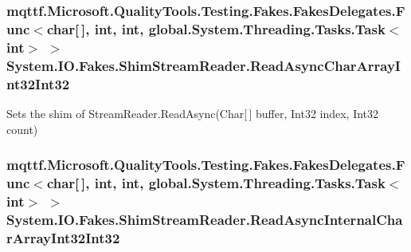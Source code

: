 \hypertarget{class_system_1_1_i_o_1_1_fakes_1_1_shim_stream_reader_ad34715a681c4e42345499cce056e4058}{
\subsubsection[{Read\-Async\-Char\-Array\-Int32\-Int32}]{\setlength{\rightskip}{0pt plus 5cm}mqttf.\-Microsoft.\-Quality\-Tools.\-Testing.\-Fakes.\-Fakes\-Delegates.\-Func$<$char\mbox{[}$\,$\mbox{]}, int, int, global.\-System.\-Threading.\-Tasks.\-Task$<$int$>$ $>$ System.\-I\-O.\-Fakes.\-Shim\-Stream\-Reader.\-Read\-Async\-Char\-Array\-Int32\-Int32\hspace{0.3cm}{\ttfamily [set]}}}\label{class_system_1_1_i_o_1_1_fakes_1_1_shim_stream_reader_ad34715a681c4e42345499cce056e4058}


Sets the shim of Stream\-Reader.\-Read\-Async(\-Char\mbox{[}$\,$\mbox{]} buffer, Int32 index, Int32 count)

\hypertarget{class_system_1_1_i_o_1_1_fakes_1_1_shim_stream_reader_a0f808be758da4c45baf5657265568ae4}{
\subsubsection[{Read\-Async\-Internal\-Char\-Array\-Int32\-Int32}]{\setlength{\rightskip}{0pt plus 5cm}mqttf.\-Microsoft.\-Quality\-Tools.\-Testing.\-Fakes.\-Fakes\-Delegates.\-Func$<$char\mbox{[}$\,$\mbox{]}, int, int, global.\-System.\-Threading.\-Tasks.\-Task$<$int$>$ $>$ System.\-I\-O.\-Fakes.\-Shim\-Stream\-Reader.\-Read\-Async\-Internal\-Char\-Array\-Int32\-Int32\hspace{0.3cm}{\ttfamily [set]}}}\label{class_system_1_1_i_o_1_1_fakes_1_1_shim_stream_reader_a0f808be758da4c45baf5657265568ae4}


